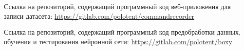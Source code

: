 Ссылка на репозиторий, содержащий программный код веб-приложения для записи датасета: \url{https://gitlab.com/polotent/commandrecorder}

Ссылка на репозиторий, содержащий программный код предобработки данных, обучения и тестирования нейронной сети: \url{https://gitlab.com/polotent/boxy}